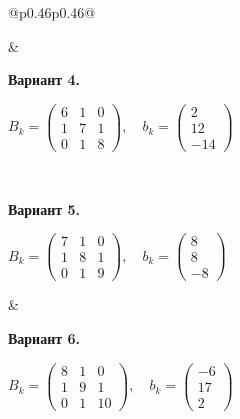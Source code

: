 \documentclass[12pt,a4paper]{article}
\begin{document}
{\begin{longtable}{@{}p{0.46\textwidth}p{0.46\textwidth}@{}}
\begin{minipage}[t]{\linewidth}
\end{minipage} &
\begin{minipage}[t]{\linewidth}\vspace{0pt}\raggedright\setlength{\parskip}{0pt}
\textbf{Вариант 4.}\par\smallskip
\(\displaystyle B_k=\begin{pmatrix}6&1&0\\1&7&1\\0&1&8\end{pmatrix},\quad b_k=\begin{pmatrix}2\\12\\-14\end{pmatrix}\)\par
\end{minipage}\\\noalign{\vskip 14pt}
\begin{minipage}[t]{\linewidth}\vspace{0pt}\raggedright\setlength{\parskip}{0pt}
\textbf{Вариант 5.}\par\smallskip
\(\displaystyle B_k=\begin{pmatrix}7&1&0\\1&8&1\\0&1&9\end{pmatrix},\quad b_k=\begin{pmatrix}8\\8\\-8\end{pmatrix}\)\par
\end{minipage} &
\begin{minipage}[t]{\linewidth}\vspace{0pt}\raggedright\setlength{\parskip}{0pt}
\textbf{Вариант 6.}\par\smallskip
\(\displaystyle B_k=\begin{pmatrix}8&1&0\\1&9&1\\0&1&10\end{pmatrix},\quad b_k=\begin{pmatrix}-6\\17\\2\end{pmatrix}\)\par
\end{minipage}\\\noalign{\vskip 14pt}
\begin{minipage}[t]{\linewidth}\vspace{0pt}\raggedright\setlength{\parskip}{0pt}

\end{minipage}
\end{longtable}}
\end{document}
